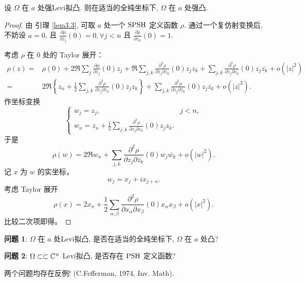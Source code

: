 \begin{proposition}[Narasimhan 引理]
    设 $\Omega $ 在 $a$ 处强Levi拟凸. 则在适当的全纯坐标下, $\Omega $ 在 $a$ 处强凸.    
\end{proposition}
\begin{proof}
    由 引理 \ref{lem3.3}, 可取 $a$ 处一个 $\operatorname{SPSH}$ 定义函数 $\rho $. 通过一个复仿射变换后, 不妨设 $a=0$, 且 $\frac{\partial \rho }{\partial z_j}(0)=0, \forall j<n$ 且 $\frac{\partial \rho }{\partial z_n}(0)=1$.
    
    考虑 \(\rho\) 在 \(0\) 处的 Taylor 展开：
\begin{align*}
\rho(z)
={}&
\rho(0)
+2\Re\sum_j
\frac{\partial\rho}{\partial z_j}(0)z_j
+\Re\sum_{j,k}
\frac{\partial^2\rho}{\partial z_j\partial z_k}(0)z_jz_k 
+\sum_{j,k}
\frac{\partial^2\rho}
{\partial z_j\partial\overline{z_k}}(0)
z_j\overline{z_k}
+o(|z|^2) \\
={}&
2\Re\left\{
z_n+\frac12\sum_{j,k}
\frac{\partial^2\rho}
{\partial z_j\partial z_k}(0)z_jz_k
\right\} 
+\sum_{j,k}
\frac{\partial^2\rho}
{\partial z_j\partial\overline{z_k}}(0)
z_j\overline{z_k}
+o(|z|^2).
\end{align*}
作坐标变换
\[
\begin{cases}
w_j=z_j, & j<n, \\[4pt]
\displaystyle
w_n=z_n+\frac12\sum_{j,k}
\frac{\partial^2\rho}
{\partial z_j\partial z_k}(0)z_jz_k.
\end{cases}
\]
于是
\[
\rho(w)
=
2\Re w_n
+
\sum_{j,k}
\frac{\partial^2\rho}
{\partial z_j\partial\overline{z_k}}(0)
w_j\overline{w_k}
+
o(|w|^2).
\]
记 \(x\) 为 \(w\) 的实坐标，
\[
w_j=x_j+i x_{j+n}.
\]
考虑 Taylor 展开
\[
\rho(x)
=
2x_n
+
\frac12\sum_{\alpha,\beta}
\frac{\partial^2\rho}
{\partial x_\alpha\partial x_\beta}(0)
x_\alpha x_\beta
+
o(|x|^2).
\]
比较二次项即得。
\end{proof}

\noindent \textbf{问题 1}: $\Omega $ 在 $a$ 处Levi拟凸, 是否在适当的全纯坐标下,   $\Omega $ 在 $a$ 处凸? 

\noindent \textbf{问题 2}: $\Omega \subset \subset {\mathbb C}^n$ Levi拟凸, 是否存在 $\operatorname{PSH}$ 定义函数? 

两个问题均存在反例! (C.Fefferman, 1974, Inv. Math).


      